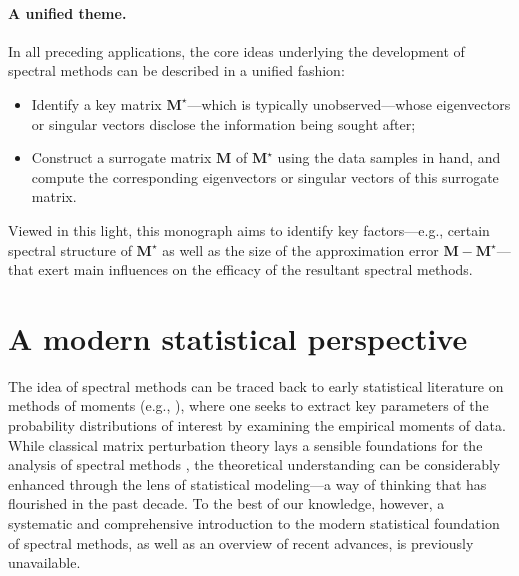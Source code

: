 \paragraph{A unified theme.}  In all preceding applications, the core ideas underlying the development of spectral methods can be described in a unified fashion:
%
\begin{itemize}
	\item[1.] Identify a key matrix $\bm{M}^{\star}$---which is typically unobserved---whose eigenvectors or singular vectors disclose the information being sought after;

	\item[2.] Construct a surrogate matrix $\bm{M}$ of $\bm{M}^{\star}$ using the data samples in hand, and compute the corresponding eigenvectors or singular vectors of this surrogate matrix.
\end{itemize}
%
Viewed in this light,  this monograph aims to identify key factors---e.g., certain spectral structure of $\bm{M}^{\star}$ as well as the size of the approximation error $\bm{M}-\bm{M}^{\star}$---that exert main influences on the efficacy of the resultant spectral methods.






\section{A modern statistical perspective}






The idea of spectral methods can be traced back to early statistical literature on methods of moments (e.g., \citet{pearson1894contributions,hansen1982large}),
where one seeks to extract key parameters of the probability distributions of interest by examining the empirical  moments of data.
While classical matrix perturbation theory lays a sensible foundations for the analysis of spectral methods \citep{stewart1990matrix},
the theoretical understanding can be considerably enhanced through the lens of statistical modeling---a way of thinking that has flourished in the past decade.
To the best of our knowledge, however,
a systematic and comprehensive introduction to the modern statistical foundation of spectral methods, as well as an overview of recent advances, is previously unavailable.




